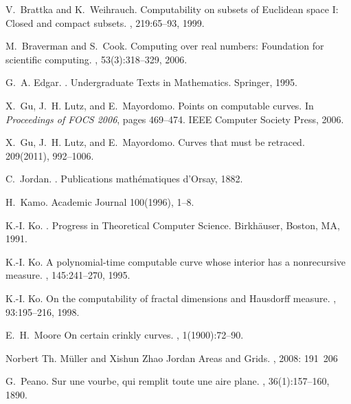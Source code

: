 \documentclass{LMCS}
\theoremstyle{plain}
\begin{document}
\begin{thebibliography}{10}

V.~Brattka and K.~Weihrauch.
\newblock Computability on subsets of {E}uclidean space {I}: Closed and compact
  subsets.
, 219:65--93, 1999.

M.~Braverman and S.~Cook.
\newblock Computing over real numbers: Foundation for scientific computing.
, 53(3):318--329, 2006.

G.~A. Edgar.
.
\newblock Undergraduate Texts in Mathematics. Springer, 1995.

X.~Gu, J.~H. Lutz, and E.~Mayordomo.
\newblock Points on computable curves.
\newblock In {\em Proceedings of FOCS 2006}, pages 469--474. IEEE Computer
  Society Press, 2006.

X.~Gu, J.~H. Lutz, and E.~Mayordomo.
\newblock Curves that must be retraced.
 209(2011), 992--1006.


C.~Jordan.
.
\newblock Publications math{\'e}matiques d'Orsay, 1882.

H.~Kamo.
\newblock Academic Journal 100(1996), 1--8.

K.-I. Ko.
.
\newblock Progress in Theoretical Computer Science. Birkh{\"a}user, Boston, MA,
  1991.

K.-I. Ko.
\newblock A polynomial-time computable curve whose interior has a nonrecursive
  measure.
, 145:241--270, 1995.

K.-I. Ko.
\newblock On the computability of fractal dimensions and Hausdorff measure.
, 93:195--216, 1998.

E.~H.~Moore
\newblock On certain crinkly curves.
, 1(1900):72--90.

Norbert Th. M\"uller and Xishun Zhao
\newblock Jordan Areas and Grids.
, 2008: 191~206

G.~Peano.
\newblock Sur une vourbe, qui remplit toute une aire plane.
, 36(1):157--160, 1890.


\end{thebibliography}
\end{document}
